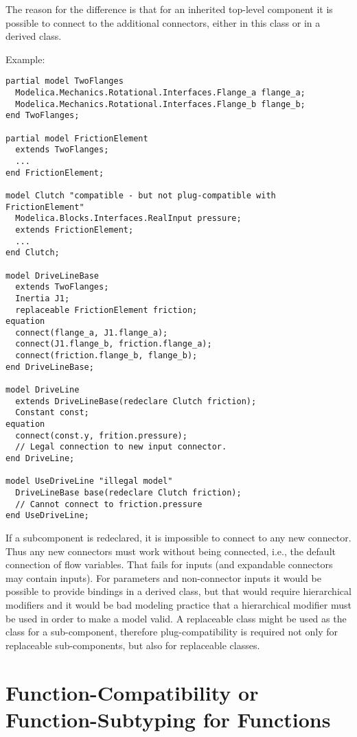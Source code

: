 \begin{nonnormative}
The reason for the difference is that for an inherited
top-level component it is possible to connect to the additional
connectors, either in this class or in a derived class.

Example:
\begin{lstlisting}[language=modelica]
partial model TwoFlanges
  Modelica.Mechanics.Rotational.Interfaces.Flange_a flange_a;
  Modelica.Mechanics.Rotational.Interfaces.Flange_b flange_b;
end TwoFlanges;

partial model FrictionElement
  extends TwoFlanges;
  ...
end FrictionElement;

model Clutch "compatible - but not plug-compatible with FrictionElement"
  Modelica.Blocks.Interfaces.RealInput pressure;
  extends FrictionElement;
  ...
end Clutch;

model DriveLineBase
  extends TwoFlanges;
  Inertia J1;
  replaceable FrictionElement friction;
equation
  connect(flange_a, J1.flange_a);
  connect(J1.flange_b, friction.flange_a);
  connect(friction.flange_b, flange_b);
end DriveLineBase;

model DriveLine
  extends DriveLineBase(redeclare Clutch friction);
  Constant const;
equation
  connect(const.y, frition.pressure);
  // Legal connection to new input connector.
end DriveLine;

model UseDriveLine "illegal model"
  DriveLineBase base(redeclare Clutch friction);
  // Cannot connect to friction.pressure
end UseDriveLine;
\end{lstlisting}

If a subcomponent is redeclared, it is impossible to connect to any new connector.  Thus any new connectors must work without being connected, i.e., the default connection of flow variables.  That fails for inputs (and expandable connectors may contain inputs).  For parameters and non-connector inputs it would be possible to provide bindings in a derived class, but that would require hierarchical modifiers and it would be bad modeling practice that a hierarchical modifier must be used in order to make a model valid.  A replaceable class might be used as the class for a sub-component, therefore plug-compatibility is required not only for replaceable sub-components, but also for replaceable classes.
\end{nonnormative}

\section{Function-Compatibility or Function-Subtyping for Functions}\label{function-compatibility-or-function-subtyping-for-functions}

